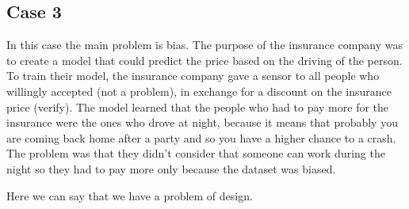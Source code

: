 \subsection{Case 3}
In this case the main problem is bias. The purpose of the insurance company was to create a model that could predict the price based on the driving of the person. To train their model, the insurance company gave a sensor to all people who willingly accepted (not a problem), in exchange for a discount on the insurance price (verify). The model learned that the people who had to pay more for the insurance were the ones who drove at night, because it means that probably you are coming back home after a party and so you have a higher chance to a crash. 
The problem was that they didn't consider that someone can work during the night so they had to pay more only because the dataset was biased.

Here we can say that we have a problem of design.

